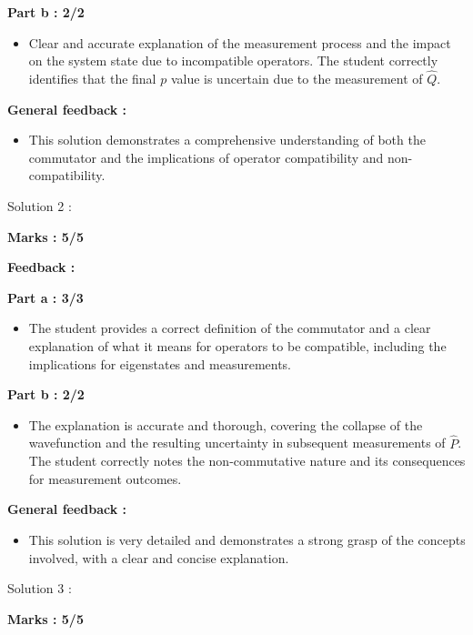 \documentclass[a4paper,11pt]{article}
\begin{document}
\textbf{Part b : 2/2}

\begin{itemize}
    \item Clear and accurate explanation of the measurement process and the impact on the system state due to incompatible operators. The student correctly identifies that the final $p$ value is uncertain due to the measurement of $\hat{Q}$.

\end{itemize}

\textbf{General feedback :}

\begin{itemize}
    \item This solution demonstrates a comprehensive understanding of both the commutator and the implications of operator compatibility and non-compatibility.
\end{itemize}


Solution 2 :

\textbf{Marks : 5/5}

\textbf{Feedback :}

\textbf{Part a : 3/3}

\begin{itemize}
    \item The student provides a correct definition of the commutator and a clear explanation of what it means for operators to be compatible, including the implications for eigenstates and measurements.
\end{itemize}

\textbf{Part b : 2/2}

\begin{itemize}
    \item The explanation is accurate and thorough, covering the collapse of the wavefunction and the resulting uncertainty in subsequent measurements of $\hat{P}$. The student correctly notes the non-commutative nature and its consequences for measurement outcomes.
\end{itemize}


\textbf{General feedback :}

\begin{itemize}
    \item This solution is very detailed and demonstrates a strong grasp of the concepts involved, with a clear and concise explanation.
\end{itemize}


Solution 3 :

\textbf{Marks : 5/5}
\end{document}
